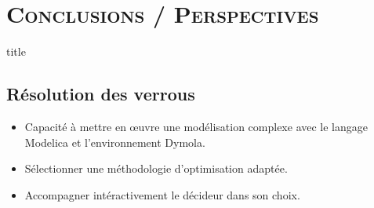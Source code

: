 \documentclass[xcolor=x11names, compress, 11pt]{beamer}
\begin{document}
\section{\scshape Conclusions / Perspectives}
\begin{frame}[plain]
    \vfill
    \centering
    \begin{beamercolorbox}[sep=8pt,center,shadow=true,rounded=true]{title}
    \insertsectionhead\par%
    \end{beamercolorbox}
    \vfill
\end{frame}


\subsection{Résolution des verrous}
\begin{frame}[t]
    \vfill
    \small
    \begin{itemize}
        \item Capacité à mettre en œuvre une modélisation complexe avec le
              langage Modelica et l’environnement Dymola.
        \vfill
        \item Sélectionner une méthodologie d’optimisation adaptée.
        \vfill
        \item Accompagner intéractivement le décideur dans son choix.
    \end{itemize}
    \vfill
\end{frame}


\end{document}
